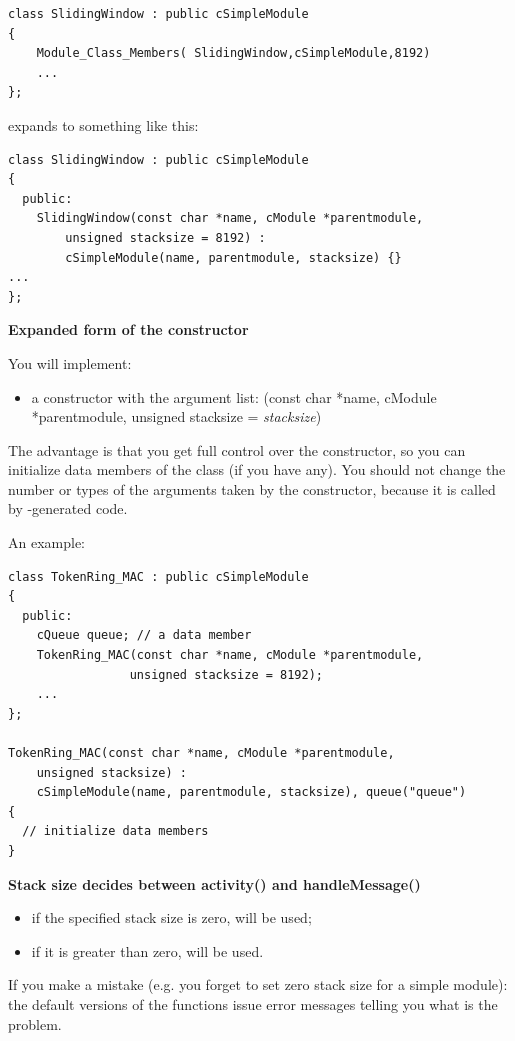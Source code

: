 \begin{verbatim}
class SlidingWindow : public cSimpleModule
{
    Module_Class_Members( SlidingWindow,cSimpleModule,8192)
    ...
};
\end{verbatim}


expands to something like this:

\begin{verbatim}
class SlidingWindow : public cSimpleModule
{
  public:
    SlidingWindow(const char *name, cModule *parentmodule,
        unsigned stacksize = 8192) :
        cSimpleModule(name, parentmodule, stacksize) {}
...
};
\end{verbatim}

\textbf{Expanded form of the constructor}


You will implement:
\begin{itemize}
\item{a constructor with the argument list: (const
    char *name, cModule *parentmodule, unsigned stacksize =
    \textit{stacksize})}
\end{itemize}

The advantage is that you get full control over the constructor,
so you can initialize data members of the class (if you have
any). You should not change the number or types of the arguments
taken by the constructor, because it is called by {\opp}-generated
code.


An example:

\begin{verbatim}
class TokenRing_MAC : public cSimpleModule
{
  public:
    cQueue queue; // a data member
    TokenRing_MAC(const char *name, cModule *parentmodule,
                 unsigned stacksize = 8192);
    ...
};

TokenRing_MAC(const char *name, cModule *parentmodule,
    unsigned stacksize) :
    cSimpleModule(name, parentmodule, stacksize), queue("queue")
{
  // initialize data members
}
\end{verbatim}


\textbf{Stack size decides between activity() and handleMessage()}

\begin{itemize}
\item{if the specified stack size is zero,  will be used;}
\item{if it is greater than zero,  will be used.}
\end{itemize}

If you make a mistake (e.g. you forget to set zero stack size
 for a 
simple module): the default versions of the
functions issue error messages telling you what is the problem.





